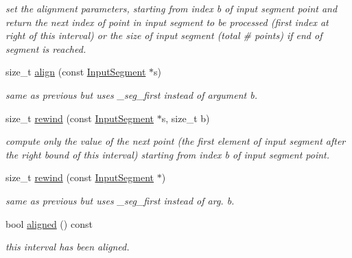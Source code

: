 \begin{DoxyCompactItemize}
\begin{DoxyCompactList}\small\item\em set the alignment parameters, starting from index b of input segment point and return the next index of point in input segment to be processed (first index at right of this interval) or the size of input segment (total \# points) if end of segment is reached. \end{DoxyCompactList}\item 
size\+\_\+t \mbox{\hyperlink{group__segment_ga85de404c4ddf91a51bf0c29c6dbe1d77}{align}} (const \mbox{\hyperlink{classInputSegment}{Input\+Segment}} $\ast$s)
\begin{DoxyCompactList}\small\item\em same as previous but uses \+\_\+seg\+\_\+first instead of argument b. \end{DoxyCompactList}\item 
size\+\_\+t \mbox{\hyperlink{group__segment_gafad6a7eea9e5892cfae9986f6263a738}{rewind}} (const \mbox{\hyperlink{classInputSegment}{Input\+Segment}} $\ast$s, size\+\_\+t b)
\begin{DoxyCompactList}\small\item\em compute only the value of the next point (the first element of input segment after the right bound of this interval) starting from index b of input segment point. \end{DoxyCompactList}\item 
size\+\_\+t \mbox{\hyperlink{group__segment_ga1a6a8f006c2d11e8f4af7250a6fb0b16}{rewind}} (const \mbox{\hyperlink{classInputSegment}{Input\+Segment}} $\ast$)
\begin{DoxyCompactList}\small\item\em same as previous but uses \+\_\+seg\+\_\+first instead of arg. b. \end{DoxyCompactList}\item 
bool \mbox{\hyperlink{group__segment_gaeb6593290d19ff04137c3f3c3e9e3175}{aligned}} () const
\begin{DoxyCompactList}\small\item\em this interval has been aligned. \end{DoxyCompactList}\end{DoxyCompactItemize}
